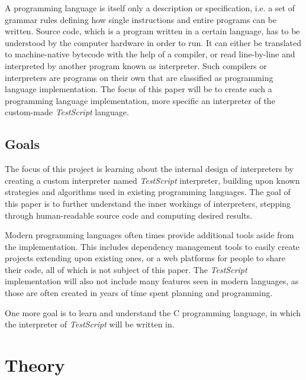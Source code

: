 \documentclass[12pt,a4paper]{article}
\newcommand{\name}{\emph{TestScript}}
\begin{document}
A programming language is itself only a description or specification, i.e. a
set of grammar rules defining how single instructions and entire programs
can be written. Source code, which is a program written in a certain language,
has to be understood by the computer hardware in order to run. It can either
be translated to machine-native bytecode with the help of a compiler, or
read line-by-line and interpreted by another program known as interpreter.
Such compilers or interpreters are programs on their own that are classified
as programming language implementation. The focus of this paper will be to
create such a programming language implementation, more specific an interpreter
of the custom-made \name{} language.

\subsection{Goals}
The focus of this project is learning about the internal design of interpreters
by creating a custom interpreter named \name{} interpreter, building upon
known strategies and algorithms used in existing programming languages.
The goal of this paper is to further understand the inner workings of
interpreters, stepping through human-readable source code and computing
desired results.

Modern programming languages often times provide additional tools aside from
the implementation. This includes dependency management tools to
easily create projects extending upon existing ones, or a web platforms for
people to share their code, all of which is not subject of this paper.
The \name{} implementation will also not include many features seen in modern
languages, as those are often created in years of time spent planning and
programming.

One more goal is to learn and understand the C programming language, in which
the interpreter of \name{} will be written in.

\section{Theory}
\end{document}
